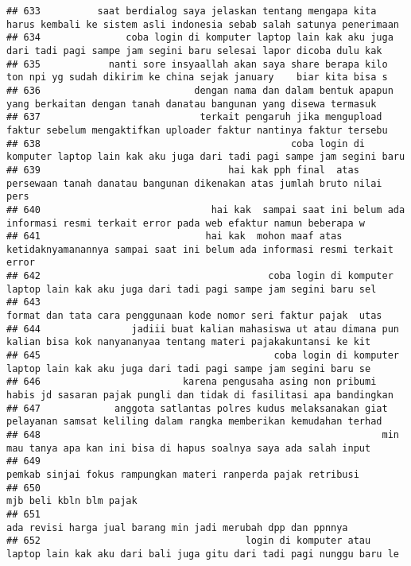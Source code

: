 \documentclass[
]{article}
\begin{document}
\begin{verbatim}
## 633          saat berdialog saya jelaskan tentang mengapa kita harus kembali ke sistem asli indonesia sebab salah satunya penerimaan
## 634               coba login di komputer laptop lain kak aku juga dari tadi pagi sampe jam segini baru selesai lapor dicoba dulu kak
## 635            nanti sore insyaallah akan saya share berapa kilo ton npi yg sudah dikirim ke china sejak january    biar kita bisa s
## 636                           dengan nama dan dalam bentuk apapun yang berkaitan dengan tanah danatau bangunan yang disewa termasuk 
## 637                            terkait pengaruh jika mengupload faktur sebelum mengaktifkan uploader faktur nantinya faktur tersebu 
## 638                                            coba login di komputer laptop lain kak aku juga dari tadi pagi sampe jam segini baru 
## 639                                 hai kak pph final  atas persewaan tanah danatau bangunan dikenakan atas jumlah bruto nilai pers 
## 640                              hai kak  sampai saat ini belum ada informasi resmi terkait error pada web efaktur namun beberapa w 
## 641                             hai kak  mohon maaf atas ketidaknyamanannya sampai saat ini belum ada informasi resmi terkait error 
## 642                                        coba login di komputer laptop lain kak aku juga dari tadi pagi sampe jam segini baru sel 
## 643                                                              format dan tata cara penggunaan kode nomor seri faktur pajak  utas 
## 644                jadiii buat kalian mahasiswa ut atau dimana pun kalian bisa kok nanyananyaa tentang materi pajakakuntansi ke kit 
## 645                                         coba login di komputer laptop lain kak aku juga dari tadi pagi sampe jam segini baru se 
## 646                         karena pengusaha asing non pribumi habis jd sasaran pajak pungli dan tidak di fasilitasi apa bandingkan 
## 647             anggota satlantas polres kudus melaksanakan giat pelayanan samsat keliling dalam rangka memberikan kemudahan terhad 
## 648                                                            min mau tanya apa kan ini bisa di hapus soalnya saya ada salah input 
## 649                                                                  pemkab sinjai fokus rampungkan materi ranperda pajak retribusi 
## 650                                                                                                          mjb beli kbln blm pajak
## 651                                                                     ada revisi harga jual barang min jadi merubah dpp dan ppnnya
## 652                                    login di komputer atau laptop lain kak aku dari bali juga gitu dari tadi pagi nunggu baru le 

\end{verbatim}
\end{document}
